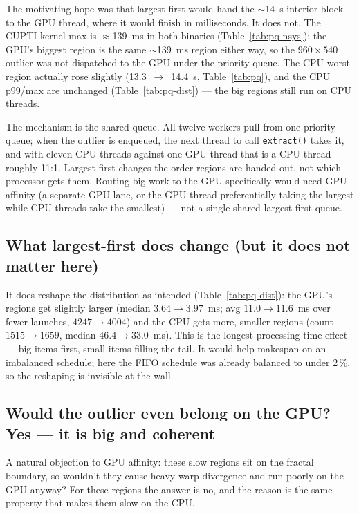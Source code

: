\documentclass[
	english,
	letterpaper, oneside
]{article}
\begin{document}
The motivating hope was that largest-first would hand the $\sim$14~s interior
block to the GPU thread, where it would finish in milliseconds. It does not.
The CUPTI kernel max is $\approx$139~ms in both binaries
(Table~\ref{tab:pq-nsys}): the GPU's biggest region is the same $\sim$139~ms
region either way, so the $960\times540$ outlier was not dispatched to
the GPU under the priority queue. The CPU worst-region actually rose slightly
(13.3~$\to$~14.4~s, Table~\ref{tab:pq}), and the CPU p99/max are unchanged
(Table~\ref{tab:pq-dist}) --- the big regions still run on CPU threads.

The mechanism is the shared queue. All twelve workers pull from one
priority queue; when the outlier is enqueued, the next thread to call
\texttt{extract()} takes it, and with eleven CPU threads against one GPU thread
that is a CPU thread roughly 11:1. Largest-first changes the order regions
are handed out, not which processor gets them. Routing big work to the GPU
specifically would need GPU affinity (a separate GPU lane, or the GPU
thread preferentially taking the largest while CPU threads take the smallest) ---
not a single shared largest-first queue.

\subsection{What largest-first does change (but it does not matter here)}

It does reshape the distribution as intended (Table~\ref{tab:pq-dist}): the GPU's
regions get slightly larger (median $3.64\to3.97$~ms; avg $11.0\to11.6$~ms over
fewer launches, $4247\to4004$) and the CPU gets more, smaller regions (count
$1515\to1659$, median $46.4\to33.0$~ms). This is the longest-processing-time
effect --- big items first, small items filling the tail. It would help makespan
on an imbalanced schedule; here the FIFO schedule was already balanced to
under 2\,\%, so the reshaping is invisible at the wall.

\subsection{Would the outlier even belong on the GPU? Yes --- it is big and coherent}

A natural objection to GPU affinity: these slow regions sit on the fractal
boundary, so wouldn't they cause heavy warp divergence and run poorly on the GPU
anyway? For these regions the answer is no, and the reason is the same
property that makes them slow on the CPU.
\end{document}
